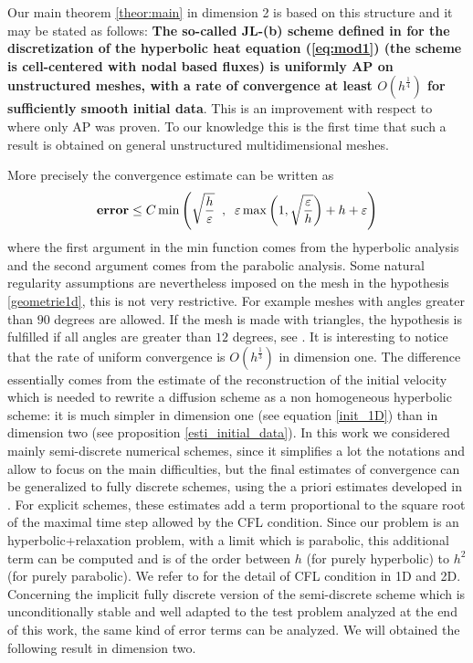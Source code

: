\documentclass[a4paper,french,english,10pt]{article}
\newcommand\eps{\varepsilon}
\newcommand\V{\mathbf{V}}
\begin{document}
Our main  theorem \ref{theor:main} in dimension 2
is based on this structure and it may be stated as follows:
{\bf The so-called JL-(b) scheme defined
in \cite{glaceap} for the discretization of the hyperbolic heat equation 
(\ref{eq:mod1}) (the scheme  is cell-centered with nodal based fluxes)
 is uniformly AP on unstructured meshes, with a rate
of convergence at least $O(h^\frac14)$ for sufficiently smooth initial data}.
This is an improvement with respect to \cite{glaceap} where only AP was proven.
To our knowledge this is the first time that such a result is obtained on general unstructured
multidimensional meshes. 


More precisely the convergence estimate can be written as 
$$
\mbox{\bf error}
\leq
C \min \left(
\sqrt{\frac h \eps  } \; \; , \; \;
\eps \max\left(1, \sqrt{\frac \eps h } \right) +
h + 
\eps
\right)
$$
where  the first argument in the min function comes from the hyperbolic analysis 
and the second argument comes from the parabolic analysis. 
Some natural regularity 
assumptions 
 are  nevertheless 
imposed on the mesh in the hypothesis \ref{geometrie1d}, this  is  not very restrictive. For example
 meshes with angles greater
than $90$ degrees are allowed. If the mesh is made with triangles,
the hypothesis is fulfilled if all angles are greater
than $12$ degrees, see \cite{glaceap}.
It is interesting to notice that
the rate of uniform 
convergence is $O(h^\frac13)$ 
in dimension one. 
The difference essentially comes from the 
estimate of the reconstruction of the initial velocity which is needed
to rewrite a diffusion scheme as a non homogeneous hyperbolic scheme:
it is much simpler in dimension one (see equation \eqref{init_1D}) than in 
dimension two (see proposition \eqref{esti_initial_data}).
In this work we considered mainly  semi-discrete numerical schemes, since it simplifies
a lot the notations and allow to focus on the main difficulties,
but the final estimates of convergence can be generalized to fully discrete schemes, using the a priori
estimates developed in \cite{de04}. 
For explicit schemes,
these estimates add a term proportional to the square root of the maximal time step allowed by the CFL
condition. Since our problem is an hyperbolic+relaxation problem, with a limit which is parabolic,
this additional term can be computed and is of the order between $h$ (for purely hyperbolic)
to $h^2$ (for purely parabolic). We refer to  \cite{glaceap} for the detail of CFL condition in 1D and 2D.
Concerning the implicit fully discrete version of the semi-discrete scheme which is unconditionally
stable and well adapted to the test problem analyzed at the end of this work, the same kind
of error terms  can be analyzed. We will obtained the following result in dimension two.
\end{document}
